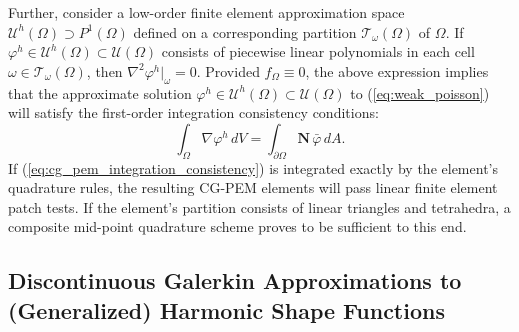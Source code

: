 	Further, consider a low-order finite element approximation space $\mathcal{U}^h (\Omega) \supset P^1 (\Omega)$ defined on a corresponding partition $\mathcal{T}_\omega (\Omega)$ of $\Omega$. If $\varphi^h \in \mathcal{U}^h (\Omega) \subset \mathcal{U} (\Omega)$ consists of piecewise linear polynomials in each cell $\omega \in \mathcal{T}_\omega (\Omega)$, then $\nabla^2 \varphi^h|_{\omega} = 0$. Provided $f_{\Omega} \equiv 0$, the above expression implies that the approximate solution $\varphi^h \in \mathcal{U}^h (\Omega) \subset \mathcal{U} (\Omega)$ to (\ref{eq:weak_poisson}) will satisfy the first-order integration consistency conditions:
	\begin{equation}
		\int_{\Omega} \nabla \varphi^h \, dV = \int_{\partial \Omega} \mathbf{N} \, \bar{\varphi} \, dA.
		\label{eq:cg_pem_integration_consistency}
	\end{equation}
	If (\ref{eq:cg_pem_integration_consistency}) is integrated exactly by the element's quadrature rules, the resulting CG-PEM elements will pass linear finite element patch tests. If the element's partition consists of linear triangles and tetrahedra, a composite mid-point quadrature scheme proves to be sufficient to this end.

\subsection*{Discontinuous Galerkin Approximations to \\ (Generalized) Harmonic Shape Functions}

